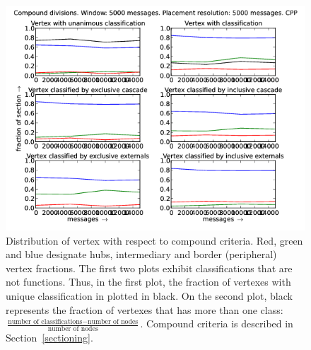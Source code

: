 \documentclass[%
 aip,
 jmp,%
 amsmath,amssymb,
 reprint,%
]{revtex4-1}
\begin{document}
\begin{figure}[hbtp] 
   \centering
        \includegraphics[width=\textwidth]{figs/CPP/5000_2}
    \caption{Distribution of vertex with respect to compound criteria. Red, green and blue designate hubs, intermediary and border (peripheral) vertex fractions. The first two plots exhibit classifications that are not functions. Thus, in the first plot, the fraction of vertexes with unique classification in plotted in black. On the second plot, black represents the fraction of vertexes that has more than one class: $\frac{\text{number of classifications} - \text{number of nodes}}{\text{number of nodes}}$. Compound criteria is described in Section~\ref{sectioning}.}
    \label{fig:cpp5000_}
\end{figure}
\end{document}
